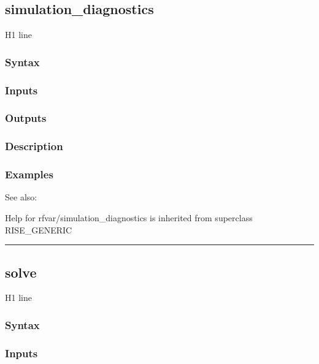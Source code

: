 \documentclass[letterpaper,10pt,english]{sphinxmanual}
\begin{document}
\subsection{simulation\_diagnostics}
\label{classes/models/@rfvar/rfvar:id125}\label{classes/models/@rfvar/rfvar:simulation-diagnostics}
H1 line


\subsubsection{Syntax}
\label{classes/models/@rfvar/rfvar:id126}

\subsubsection{Inputs}
\label{classes/models/@rfvar/rfvar:id127}

\subsubsection{Outputs}
\label{classes/models/@rfvar/rfvar:id128}

\subsubsection{Description}
\label{classes/models/@rfvar/rfvar:id129}

\subsubsection{Examples}
\label{classes/models/@rfvar/rfvar:id130}
See also:

Help for rfvar/simulation\_diagnostics is inherited from superclass RISE\_GENERIC


\bigskip\hrule{}\bigskip



\subsection{solve}
\label{classes/models/@rfvar/rfvar:id131}\label{classes/models/@rfvar/rfvar:solve}
H1 line


\subsubsection{Syntax}
\label{classes/models/@rfvar/rfvar:id132}

\subsubsection{Inputs}
\label{classes/models/@rfvar/rfvar:id133}
\end{document}

